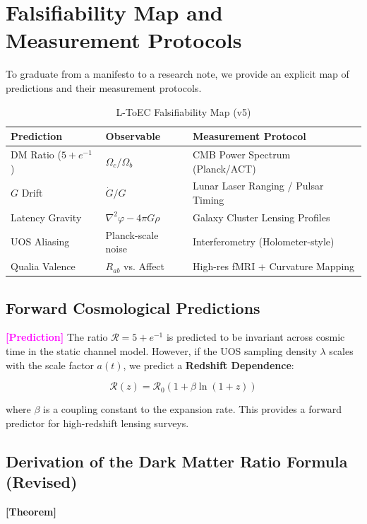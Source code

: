 \documentclass[11pt,titlepage]{article}
\newcommand{\tagtheo}{\textcolor{green!60!black}{\textbf{[Theorem]}} }
\newcommand{\tagpred}{\textcolor{magenta}{\textbf{[Prediction]}} }
\begin{document}
\section{Falsifiability Map and Measurement Protocols}
\label{sec:falsifiability}
To graduate from a manifesto to a research note, we provide an explicit map of predictions and their measurement protocols.

\begin{table}[h!]
\centering
\begin{tabular}{@{}lll@{}}
\toprule
\textbf{Prediction} & \textbf{Observable} & \textbf{Measurement Protocol} \\ \midrule
DM Ratio ($5+e^{-1}$) & $\Omega_c / \Omega_b$ & CMB Power Spectrum (Planck/ACT) \\
$G$ Drift & $\dot{G}/G$ & Lunar Laser Ranging / Pulsar Timing \\
Latency Gravity & $\nabla^2 \varphi - 4\pi G \rho$ & Galaxy Cluster Lensing Profiles \\
UOS Aliasing & Planck-scale noise & Interferometry (Holometer-style) \\
Qualia Valence & $R_{ab}$ vs. Affect & High-res fMRI + Curvature Mapping \\ \bottomrule
\end{tabular}
\caption{L-ToEC Falsifiability Map (v5)}
\end{table}


\subsection{Forward Cosmological Predictions}
\tagpred The ratio $\mathcal{R} = 5 + e^{-1}$ is predicted to be invariant across cosmic time in the static channel model. However, if the UOS sampling density $\lambda$ scales with the scale factor $a(t)$, we predict a \textbf{Redshift Dependence}:

\begin{equation}
\mathcal{R}(z) = \mathcal{R}_0 (1 + \beta \ln(1+z))
\end{equation}

where $\beta$ is a coupling constant to the expansion rate. This provides a forward predictor for high-redshift lensing surveys.

\subsection{Derivation of the Dark Matter Ratio Formula (Revised)}
\tagtheo \label{deriv:dm-ratio-revised} 
\end{document}
